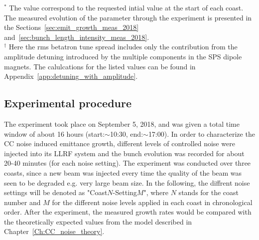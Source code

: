 \begin{table}[!hbt]
\begin{minipage}{\textwidth}
\begin{centering}
   \label{tab:machine_beam_param_2018}
   \end{centering} \footnotesize{$^\ast$ The value correspond to the requested intial value at the start of each coast. The measured evolution of the parameter through the experiment is presented in the Sections~\ref{sec:emit_growth_meas_2018} and~\ref{sec:bunch_length_intensity_meas_2018}.\\$^\dagger$ Here the rms betatron tune spread includes only the contribution from the amplitude detuning introduced by the multiple components in the SPS dipole magnets. The calulcations for the listed values can be found in Appendix~\ref{app:detuning_with_amplitude}.}
   \end{minipage}
\end{table}


\subsection{Experimental procedure}\label{sec:experimental_procedure_2018}
The experiment took place on September 5, 2018, and was given a total time window of about 16 hours (start:$\sim$10:30, end:$\sim$17:00). In order to characterize the CC noise induced emittance growth, different levels of controlled noise were injected into its LLRF system and the bunch evolution was recorded for about 20-40 minutes (for each noise setting). The experiment was conducted over three coasts, since a new beam was injected every time the quality of the beam was seen to be degraded e.g. very large beam size. In the following, the diffrent noise settings will be denoted as "Coast$N$-Setting$M$", where $N$ stands for the coast number and $M$ for the different noise levels applied in each coast in chronological order. After the experiment, the measured growth rates would be compared with the theoretically expected values from the model described in Chapter~\ref{Ch:CC_noise_theory}.


